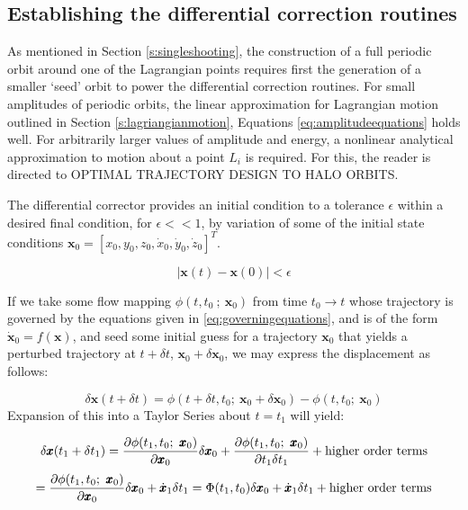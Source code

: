 \subsection{Establishing the differential correction routines}

As mentioned in Section \ref{s:singleshooting}, the construction of a full periodic orbit around one of the Lagrangian points requires first the generation of a smaller `seed' orbit to power the differential correction routines. For small amplitudes of periodic orbits, the linear approximation for Lagrangian motion outlined in Section \ref{s:lagriangianmotion}, Equations \ref{eq:amplitudeequations} holds well. For arbitrarily larger values of amplitude and energy, a nonlinear analytical approximation to motion about a point $L_i$ is required. For this, the reader is directed to OPTIMAL TRAJECTORY DESIGN TO HALO ORBITS. 

The differential corrector provides an initial condition to a tolerance $\epsilon$ within a desired final condition, for $\epsilon << 1$, by variation of some of the initial state conditions $\pmb{x}_0 = [x_0, y_0, z_0, \dot{x}_0, \dot{y}_0, \dot{z}_0]^T$.

\begin{equation}
| \pmb{x}(t) - \pmb{x}(0) | < \epsilon
\end{equation}

If we take some flow mapping $\phi(t, t_0~;~\pmb{x}_0)$ from time $t_0 \rightarrow t$ whose trajectory is governed by the equations given in \ref{eq:governingequations}, and is of the form $\dot{\pmb{x}}_0 = f(\pmb{x})$, and seed some initial guess for a trajectory $\pmb{x}_0$ that yields a perturbed trajectory at $t+\delta t$, $\pmb{x}_0 + \delta \pmb{x}_0$, we may express the displacement as follows:

\begin{equation}
\delta \pmb{x}(t+\delta t) = \phi (t+\delta t, t_0;~\pmb{x}_0 + \delta \pmb{x}_0) - \phi(t, t_0;~\pmb{x}_0)
\end{equation}
\noindent Expansion of this into a Taylor Series about $t = t_1$ will yield:

\begin{equation}
\delta \pmb{x}(t_1 + \delta t_1 ) = \frac{\partial\phi (t_1, t_0;~\pmb{x}_0)}{\partial \pmb{x}_0} \delta \pmb{x}_0 + \frac{\partial\phi (t_1, t_0;~\pmb{x}_0)}{\partial t_1 \delta t_1} + \textnormal{higher order terms}
\end{equation}
\begin{equation}
= \frac{\partial\phi (t_1, t_0;~\pmb{x}_0)}{\partial \pmb{x}_0} \delta \pmb{x}_0 + \dot{\pmb{x}}_1 \delta t_1 = \Phi(t_1, t_0) \delta \pmb{x}_0 + \dot{\pmb{x}}_1 \delta t_1 + \textnormal{higher order terms}
\end{equation}

